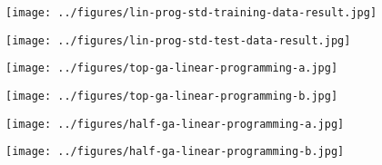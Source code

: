 \documentclass[12pt,letter]{article}
\begin{document}
\begin{figure}[h!]
\texttt{[image: ../figures/lin-prog-std-training-data-result.jpg]}
\centering
\end{figure}

\begin{figure}[h!]
\texttt{[image: ../figures/lin-prog-std-test-data-result.jpg]}
\centering
\end{figure}

\begin{figure}[h!]
\texttt{[image: ../figures/top-ga-linear-programming-a.jpg]}
\centering
\end{figure}
\begin{figure}[h!]
\texttt{[image: ../figures/top-ga-linear-programming-b.jpg]}
\centering
\end{figure}
\begin{figure}[h!]
\texttt{[image: ../figures/half-ga-linear-programming-a.jpg]}
\centering
\end{figure}
\begin{figure}[h!]
\texttt{[image: ../figures/half-ga-linear-programming-b.jpg]}
\centering
\end{figure}
\end{document}
